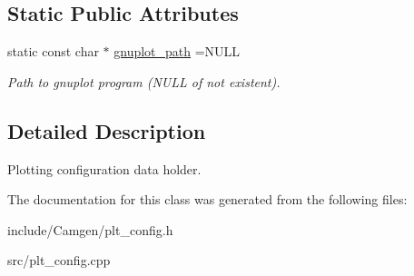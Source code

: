 \subsection*{Static Public Attributes}
\begin{DoxyCompactItemize}
\item 
\hypertarget{a00427_ad397bbb1415a8958506aab635f26ed60}{}static const char $\ast$ \hyperlink{a00427_ad397bbb1415a8958506aab635f26ed60}{gnuplot\+\_\+path} =N\+U\+L\+L\label{a00427_ad397bbb1415a8958506aab635f26ed60}

\begin{DoxyCompactList}\small\item\em Path to gnuplot program (N\+U\+L\+L of not existent). \end{DoxyCompactList}\end{DoxyCompactItemize}


\subsection{Detailed Description}
Plotting configuration data holder. 

The documentation for this class was generated from the following files\+:\begin{DoxyCompactItemize}
\item 
include/\+Camgen/plt\+\_\+config.\+h\item 
src/plt\+\_\+config.\+cpp\end{DoxyCompactItemize}

